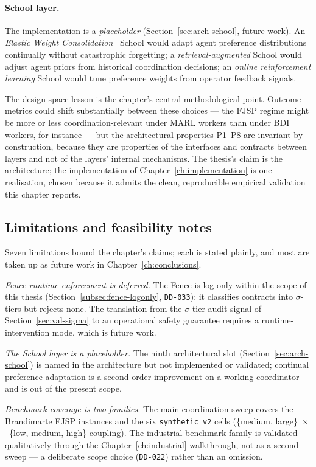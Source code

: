 \paragraph{School layer.}
The implementation is a \emph{placeholder}
(Section~\ref{sec:arch-school}, future work). An
\emph{Elastic Weight Consolidation}~\cite{kirkpatrick2017} School
would adapt agent preference distributions continually without
catastrophic forgetting; a \emph{retrieval-augmented} School would
adjust agent priors from historical coordination decisions; an
\emph{online reinforcement learning} School would tune preference
weights from operator feedback signals.

The design-space lesson is the chapter's central methodological
point. Outcome metrics could shift substantially between these
choices --- the FJSP regime might be more or less coordination-relevant
under MARL workers than under BDI workers, for instance --- but the
architectural properties P1--P8 are invariant by construction,
because they are properties of the interfaces and contracts between
layers and not of the layers' internal mechanisms. The thesis's claim
is the architecture; the implementation of
Chapter~\ref{ch:implementation} is one realisation, chosen because it
admits the clean, reproducible empirical validation this chapter
reports.

\subsection{Limitations and feasibility notes}
\label{subsec:val-limits}

Seven limitations bound the chapter's claims; each is stated plainly,
and most are taken up as future work in
Chapter~\ref{ch:conclusions}.

\emph{Fence runtime enforcement is deferred.} The Fence is log-only
within the scope of this thesis (Section~\ref{subsec:fence-logonly},
\texttt{DD-033}): it classifies contracts into $\sigma$-tiers but
rejects none. The translation from the $\sigma$-tier audit signal of
Section~\ref{sec:val-sigma} to an operational safety guarantee
requires a runtime-intervention mode, which is future work.

\emph{The School layer is a placeholder.} The ninth architectural
slot (Section~\ref{sec:arch-school}) is named in the architecture but
not implemented or validated; continual preference adaptation is a
second-order improvement on a working coordinator and is out of the
present scope.

\emph{Benchmark coverage is two families.} The main coordination
sweep covers the Brandimarte FJSP instances and the six
\texttt{synthetic\_v2} cells (\{medium, large\}~$\times$~\{low,
medium, high\} coupling). The industrial benchmark family is
validated qualitatively through the Chapter~\ref{ch:industrial}
walkthrough, not as a second sweep --- a deliberate scope choice
(\texttt{DD-022}) rather than an omission.

